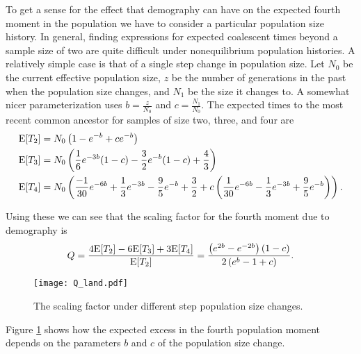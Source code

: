 To get a sense for the effect that demography can have on the expected fourth
moment in the population we have to consider a particular population size
history. In general, finding expressions for expected coalescent times beyond a
sample size of two are quite difficult under nonequilibrium population
histories. A relatively simple case is that of a single step change in
population size. Let $N_0$ be the current effective population size, $z$ be the
number of generations in the past when the population size changes, and $N_1$ be
the size it changes to. A somewhat nicer parameterization uses $b=\frac{z}{N_0}$
and $c=\frac{N_1}{N_0}$. The expected times to the most recent common ancestor
for samples of size two, three, and four are
\begin{align}
  \mathrm{E}[T_2] &= N_0\left( 1-e^{-b} + ce^{-b} \right) \nonumber \\
  \mathrm{E}[T_3] &= N_0\left( \frac{1}{6} e^{-3b}(1-c) - \frac{3}{2}e^{-b}(1-c) + \frac{4}{3} \right) \nonumber \\
  \mathrm{E}[T_4] &= N_0\left( \frac{-1}{30}e^{-6b} + \frac{1}{3}e^{-3b} - \frac{9}{5}e^{-b} + \frac{3}{2}
  + c\left( \frac{1}{30}e^{-6b} - \frac{1}{3}e^{-3b} +\frac{9}{5}e^{-b} \right)\right). \nonumber \\
\end{align}

Using these we can see that the scaling factor for the fourth moment due to
demography is
\begin{equation}
  Q = \frac{ 4\mathrm{E}[T_2] - 6\mathrm{E}[T_3] + 3\mathrm{E}[T_4]}{\mathrm{E}[T_2]} =
    \frac{\left( e^{2b} - e^{-2b} \right)(1-c)}{2\left(e^{b} -1 + c\right)}.
\end{equation}
\begin{figure}
  \label{fig:Qland}
  \centering
  \texttt{[image: Q\_land.pdf]}
  \caption{The scaling factor under different step population size
    changes.}
\end{figure}
Figure \ref{fig:Qland} shows how the expected excess in the fourth population
moment depends on the parameters $b$ and $c$ of the population size change. 
